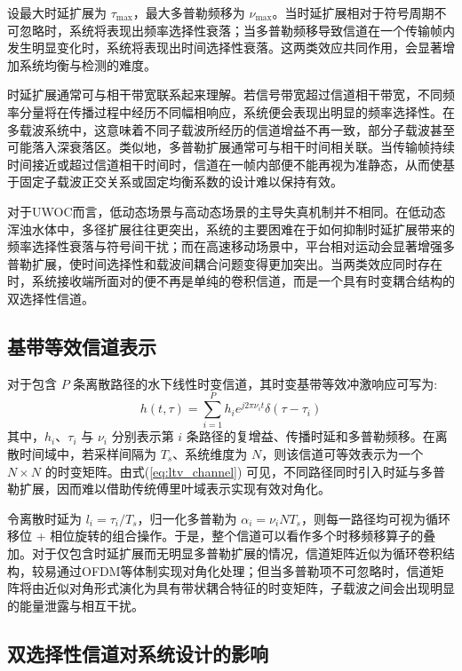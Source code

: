 设最大时延扩展为 $\tau_{\max}$，最大多普勒频移为 $\nu_{\max}$。当时延扩展相对于符号周期不可忽略时，系统将表现出频率选择性衰落；当多普勒频移导致信道在一个传输帧内发生明显变化时，系统将表现出时间选择性衰落。这两类效应共同作用，会显著增加系统均衡与检测的难度。

时延扩展通常可与相干带宽联系起来理解。若信号带宽超过信道相干带宽，不同频率分量将在传播过程中经历不同幅相响应，系统便会表现出明显的频率选择性。在多载波系统中，这意味着不同子载波所经历的信道增益不再一致，部分子载波甚至可能落入深衰落区。类似地，多普勒扩展通常可与相干时间相关联。当传输帧持续时间接近或超过信道相干时间时，信道在一帧内部便不能再视为准静态，从而使基于固定子载波正交关系或固定均衡系数的设计难以保持有效。

对于UWOC而言，低动态场景与高动态场景的主导失真机制并不相同。在低动态浑浊水体中，多径扩展往往更突出，系统的主要困难在于如何抑制时延扩展带来的频率选择性衰落与符号间干扰；而在高速移动场景中，平台相对运动会显著增强多普勒扩展，使时间选择性和载波间耦合问题变得更加突出。当两类效应同时存在时，系统接收端所面对的便不再是单纯的卷积信道，而是一个具有时变耦合结构的双选择性信道。

\subsection{基带等效信道表示}

对于包含 $P$ 条离散路径的水下线性时变信道，其时变基带等效冲激响应可写为:
\begin{equation}
    h(t, \tau) = \sum_{i=1}^{P} h_{i} e^{j 2 \pi \nu_{i} t} \delta(\tau - \tau_{i})
\label{eq:ltv_channel}
\end{equation}
其中，$h_i$、$\tau_i$ 与 $\nu_i$ 分别表示第 $i$ 条路径的复增益、传播时延和多普勒频移。在离散时间域中，若采样间隔为 $T_s$、系统维度为 $N$，则该信道可等效表示为一个 $N \times N$ 的时变矩阵。由式(\ref{eq:ltv_channel}) 可见，不同路径同时引入时延与多普勒扩展，因而难以借助传统傅里叶域表示实现有效对角化。

令离散时延为 $l_i=\tau_i/T_s$，归一化多普勒为 $\alpha_i=\nu_i N T_s$，则每一路径均可视为循环移位 + 相位旋转的组合操作。于是，整个信道可以看作多个时移频移算子的叠加。对于仅包含时延扩展而无明显多普勒扩展的情况，信道矩阵近似为循环卷积结构，较易通过OFDM等体制实现对角化处理；但当多普勒项不可忽略时，信道矩阵将由近似对角形式演化为具有带状耦合特征的时变矩阵，子载波之间会出现明显的能量泄露与相互干扰。



\subsection{双选择性信道对系统设计的影响}

